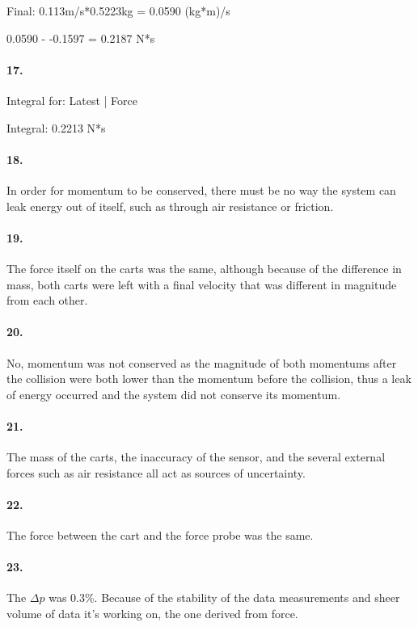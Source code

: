     Final: 0.113m/s*0.5223kg = 0.0590 (kg*m)/s

    0.0590 - -0.1597 = 0.2187 N*s

    \paragraph*{17.}

    Integral for: Latest | Force
    
    Integral: 0.2213 N*s

    \paragraph*{18.}

    In order for momentum to be conserved, there must be no way the system can leak energy out of itself, such as through air resistance or friction.

    \paragraph*{19.}

    The force itself on the carts was the same, although because of the difference in mass, both carts were left with a final velocity that was different in magnitude from each other.

    \paragraph*{20.}

    No, momentum was not conserved as the magnitude of both momentums after the collision were both lower than the momentum before the collision, thus a leak of energy occurred and the system did not conserve its momentum.

    \paragraph*{21.}

    The mass of the carts, the inaccuracy of the sensor, and the several external forces such as air resistance all act as sources of uncertainty.

    \paragraph*{22.}

    The force between the cart and the force probe was the same.

    \paragraph*{23.}

    The $\Delta p$ was 0.3\%. Because of the stability of the data measurements and sheer volume of data it's working on, the one derived from force.

